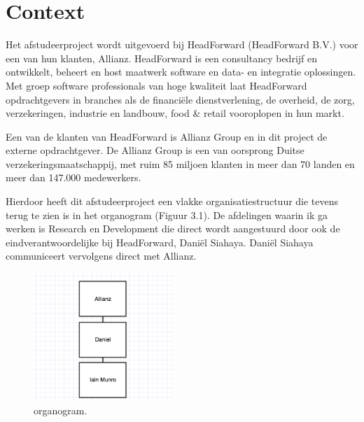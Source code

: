 \chapter{Context}
Het afstudeerproject wordt uitgevoerd bij HeadForward (HeadForward B.V.) voor een van hun klanten, Allianz. HeadForward is een consultancy bedrijf en ontwikkelt, beheert en host maatwerk software en data- en integratie oplossingen. Met groep software professionals van hoge kwaliteit laat HeadForward opdrachtgevers in branches als de financiële dienstverlening, de overheid, de zorg, verzekeringen, industrie en landbouw, food \& retail vooroplopen in hun markt.\par
Een van de klanten van HeadForward is Allianz Group en in dit project de externe opdrachtgever. De Allianz Group is een van oorsprong Duitse verzekeringsmaatschappij, met ruim 85 miljoen klanten in meer dan 70 landen en meer dan 147.000 medewerkers. \par
Hierdoor heeft dit afstudeerproject een vlakke organisatiestructuur die tevens terug te zien is in het organogram (Figuur 3.1). De afdelingen waarin ik ga werken is Research en Development die direct wordt aangestuurd door ook de eindverantwoordelijke bij HeadForward, Dani\"el Siahaya. Dani\"el Siahaya communiceert vervolgens direct met Allianz.\par
\begin{figure}[ht]
    \begin{center}
        \includegraphics[width=200px]{images/org.png}
        \caption{organogram.}
    \end{center}
\end{figure}